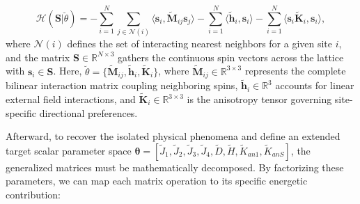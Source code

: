 \documentclass[final,5p,times,twocolumn]{elsarticle}
\begin{document}
\begin{equation}\label{eq:GeneralizedHamiltonian}
\mathcal{H}\left(\mathbf{S}| \breve{\theta}\right) = 
- \sum_{i=1}^{N}\sum_{j\in \mathcal{N}(i)} 
    \langle \mathbf{s}_i, \tilde{\mathbf{M}}_{ij}\mathbf{s}_j \rangle
- \sum_{i=1}^{N} \langle\tilde{\mathbf{h}}_{i},\mathbf{s}_i\rangle 
- \sum_{i=1}^{N} \langle\mathbf{s}_i \tilde{\mathbf{K}}_i, 
    \mathbf{s}_i\rangle,
\end{equation}
where $\mathcal{N}(i)$ defines the set of interacting nearest neighbors for a given site $i$, and the matrix $\mathbf{S}\in\mathbb{R}^{N\times 3}$ 
gathers the continuous spin vectors across the lattice with 
$\mathbf{s}_i\in\mathbf{S}$. Here, 
$\breve{\theta}=\{\tilde{\mathbf{M}}_{ij},\tilde{\mathbf{h}}_{i},
\tilde{\mathbf{K}}_{i}\}$, where 
$\tilde{\mathbf{M}}_{ij} \in \mathbb{R}^{3 \times 3}$ represents the complete bilinear interaction matrix coupling neighboring spins, $\tilde{\mathbf{h}}_i \in \mathbb{R}^{3}$ accounts for linear external field interactions, and $\tilde{\mathbf{K}}_i \in \mathbb{R}^{3 \times 3}$ 
is the anisotropy tensor governing site-specific directional preferences.

Afterward, to recover the isolated physical phenomena and define an extended target scalar parameter space 
$\boldsymbol{\theta}=[\tilde{J}_1,\tilde{J}_2,\tilde{J}_3,\tilde{J}_4,
\tilde{D},\tilde{H},\tilde{K}_{an1},\tilde{K}_{anS}]$, the generalized matrices must be mathematically decomposed. By factorizing these parameters, we can map each matrix operation to its specific energetic contribution:
\end{document}
